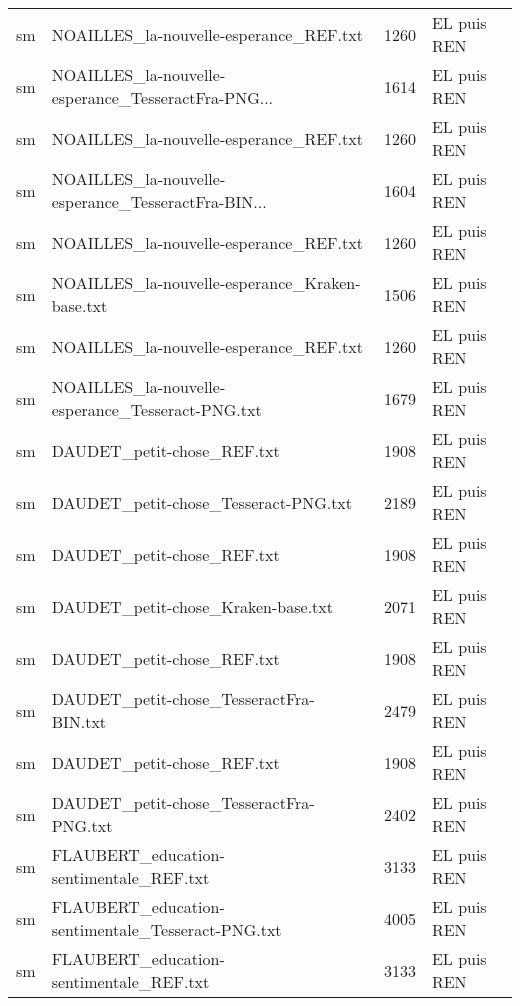 \begin{tabular}{llrl}
    sm &             NOAILLES\_la-nouvelle-esperance\_REF.txt &                  1260 & EL puis REN \\
    sm & NOAILLES\_la-nouvelle-esperance\_TesseractFra-PNG... &                  1614 & EL puis REN \\
    sm &             NOAILLES\_la-nouvelle-esperance\_REF.txt &                  1260 & EL puis REN \\
    sm & NOAILLES\_la-nouvelle-esperance\_TesseractFra-BIN... &                  1604 & EL puis REN \\
    sm &             NOAILLES\_la-nouvelle-esperance\_REF.txt &                  1260 & EL puis REN \\
    sm &     NOAILLES\_la-nouvelle-esperance\_Kraken-base.txt &                  1506 & EL puis REN \\
    sm &             NOAILLES\_la-nouvelle-esperance\_REF.txt &                  1260 & EL puis REN \\
    sm &   NOAILLES\_la-nouvelle-esperance\_Tesseract-PNG.txt &                  1679 & EL puis REN \\
    sm &                         DAUDET\_petit-chose\_REF.txt &                  1908 & EL puis REN \\
    sm &               DAUDET\_petit-chose\_Tesseract-PNG.txt &                  2189 & EL puis REN \\
    sm &                         DAUDET\_petit-chose\_REF.txt &                  1908 & EL puis REN \\
    sm &                 DAUDET\_petit-chose\_Kraken-base.txt &                  2071 & EL puis REN \\
    sm &                         DAUDET\_petit-chose\_REF.txt &                  1908 & EL puis REN \\
    sm &            DAUDET\_petit-chose\_TesseractFra-BIN.txt &                  2479 & EL puis REN \\
    sm &                         DAUDET\_petit-chose\_REF.txt &                  1908 & EL puis REN \\
    sm &            DAUDET\_petit-chose\_TesseractFra-PNG.txt &                  2402 & EL puis REN \\
    sm &            FLAUBERT\_education-sentimentale\_REF.txt &                  3133 & EL puis REN \\
    sm &  FLAUBERT\_education-sentimentale\_Tesseract-PNG.txt &                  4005 & EL puis REN \\
    sm &            FLAUBERT\_education-sentimentale\_REF.txt &                  3133 & EL puis REN \\

\end{tabular}
